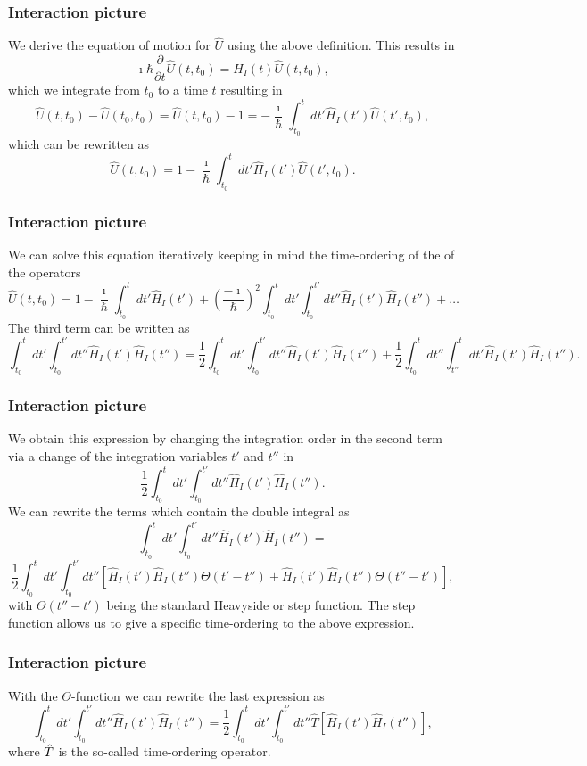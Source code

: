 \documentclass[compress]{beamer}
\begin{document}
\frame
{
\frametitle{Interaction picture}
\begin{small}
{\scriptsize
We derive the equation of motion for $\hat{U}$ using the above definition.
This results in
\[
\imath \hbar\frac{\partial }{\partial t}\hat{U}(t,t_0) = \hat{H}_I(t)\hat{U}(t,t_0),
\]
which we integrate from $t_0$ to a time $t$ resulting in
\[
\hat{U}(t,t_0)-\hat{U}(t_0,t_0)=\hat{U}(t,t_0)-1=-\frac{\imath}{\hbar}\int_{t_0}^t dt' \hat{H}_I(t')\hat{U}(t',t_0),
\]
which can be rewritten as
\[
\hat{U}(t,t_0)=1-\frac{\imath}{\hbar}\int_{t_0}^t dt' \hat{H}_I(t')\hat{U}(t',t_0).
\]
}
\end{small}
}
\frame
{
\frametitle{Interaction picture}
\begin{small}
{\scriptsize
We can solve this equation iteratively keeping in mind the time-ordering of the of the operators
\[
\hat{U}(t,t_0)=1-\frac{\imath}{\hbar}\int_{t_0}^t dt' \hat{H}_I(t')+\left(\frac{-\imath}{\hbar}\right)^2\int_{t_0}^t dt'\int_{t_0}^{t'} dt'' \hat{H}_I(t')\hat{H}_I(t'')+\dots
\]
The third term can be written as 
\[
\int_{t_0}^t dt'\int_{t_0}^{t'} dt'' \hat{H}_I(t')\hat{H}_I(t'')=
\frac{1}{2}\int_{t_0}^t dt'\int_{t_0}^{t'} dt'' \hat{H}_I(t')\hat{H}_I(t'')
+\frac{1}{2}\int_{t_0}^t dt''\int_{t''}^{t} dt' \hat{H}_I(t')\hat{H}_I(t'').
\]
}
\end{small}
}
\frame
{
\frametitle{Interaction picture}
\begin{small}
{\scriptsize
We obtain this expression by changing the integration order in the second term
via a change of the integration variables $t'$ and $t''$  in 
\[
\frac{1}{2}\int_{t_0}^t dt'\int_{t_0}^{t'} dt'' \hat{H}_I(t')\hat{H}_I(t'').
\]
We can rewrite the terms which contain the double integral as
\[
\int_{t_0}^t dt'\int_{t_0}^{t'} dt'' \hat{H}_I(t')\hat{H}_I(t'')=\]
\[
\frac{1}{2}\int_{t_0}^t dt'\int_{t_0}^{t'} dt''\left[\hat{H}_I(t')\hat{H}_I(t'')\Theta(t'-t'')
+\hat{H}_I(t')\hat{H}_I(t'')\Theta(t''-t')\right],
\]
with $\Theta(t''-t')$ being the standard Heavyside or step function. The step function allows us to give a specific time-ordering to the above expression.
}
\end{small}
}
\frame
{
\frametitle{Interaction picture}
\begin{small}
{\scriptsize
With the $\Theta$-function we can rewrite the last expression as 
\[
\int_{t_0}^t dt'\int_{t_0}^{t'} dt'' \hat{H}_I(t')\hat{H}_I(t'')=
\frac{1}{2}\int_{t_0}^t dt'\int_{t_0}^{t'} dt''\hat{T}\left[\hat{H}_I(t')\hat{H}_I(t'')\right],
\]
where $\Hat{T}$ is the so-called time-ordering operator. 
}
\end{small}
}
\end{document}
